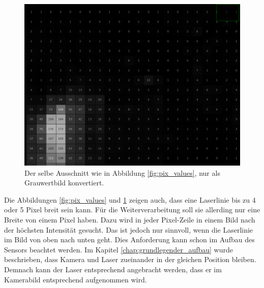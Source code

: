 	\begin{figure}[h]
		\centering
		\includegraphics[width=0.75\linewidth]{img/hauptteil/bildverarbeitung/pixel_values_gray.png}
		\caption[Pixel-Werte im Grauwertbild]{Der selbe Ausschnitt wie in Abbildung \ref{fig:pix_values}, nur als Grauwertbild konvertiert.}
		\label{fig:pix_values_gray}
	\end{figure} 
	
	Die Abbildungen \ref{fig:pix_values} und \ref{fig:pix_values_gray} zeigen auch, dass eine Laserlinie bis zu 4 oder 5 Pixel breit sein kann. Für die Weiterverarbeitung soll sie allerding nur eine Breite von einem Pixel haben. Dazu wird in jeder Pixel-Zeile in einem Bild nach der höchsten Intensität gesucht. Das ist jedoch nur sinnvoll, wenn die Laserlinie im Bild von oben nach unten geht. Dies Anforderung kann schon im Aufbau des Sensors beachtet werden. Im Kapitel \ref{chap:grundlegender_aufbau} wurde beschrieben, dass Kamera und Laser zueinander in der gleichen Position bleiben. Demnach kann der Laser entsprechend angebracht werden, dass er im Kamerabild entsprechend aufgenommen wird.
	
